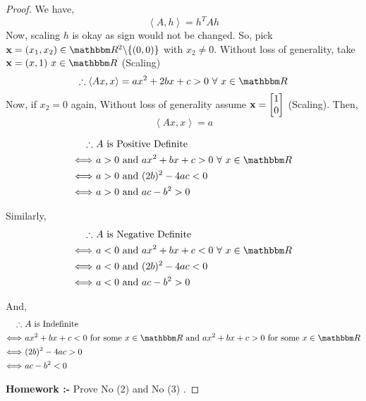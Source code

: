 \documentclass[../Analysis-3]{subfiles}
\begin{document}
\begin{proof}
    We have, \[ \left\langle A, h \right\rangle = h^TAh \]
    Now, scaling $h$ is okay as sign would not be changed. So, pick ${\bf x} = (x_1, x_2) \in \R^2 \backslash \{(0,0)\} $ with $x_2 \neq 0$.
    Without loss of generality, take ${\bf x} = (x,1) \ x \in \R$ (Scaling) \\
    \[ \therefore \left\langle Ax, x \right\rangle = ax^2 + 2bx + c > 0 \ \forall\ x \in \R \]
    Now, if $x_2 = 0$ again, Without loss of generality assume ${\bf x} = \begin{bmatrix}
            1 \\
            0
        \end{bmatrix}$ (Scaling). Then, \[ \left\langle Ax, x \right\rangle = a \]

    \begin{align*}
        \therefore          & \ A \text{ is Positive Definite}                         \\
        \Longleftrightarrow & \ a > 0 \text{ and } ax^2 + bx+c > 0 \ \forall\ x \in \R \\
        \Longleftrightarrow & \ a > 0 \text{ and } (2b)^2 - 4ac < 0                    \\
        \Longleftrightarrow & \ a > 0 \text{ and } ac - b^2 > 0
    \end{align*}

    Similarly,
    \begin{align*}
        \therefore          & \ A \text{ is Negative Definite}                         \\
        \Longleftrightarrow & \ a < 0 \text{ and } ax^2 + bx+c < 0 \ \forall\ x \in \R \\
        \Longleftrightarrow & \ a < 0 \text{ and } (2b)^2 - 4ac < 0                    \\
        \Longleftrightarrow & \ a < 0 \text{ and } ac - b^2 > 0
    \end{align*}

    And,
    \begin{align*}
        \therefore          & \ A \text{ is Indefinite}                                                                              \\
        \Longleftrightarrow & \ ax^2 + bx+c < 0 \ \text{for some } x \in \R \text{ and } ax^2 + bx+c > 0 \ \text{for some } x \in \R \\
        \Longleftrightarrow & \ (2b)^2 - 4ac > 0                                                                                     \\
        \Longleftrightarrow & \ ac - b^2 < 0
    \end{align*}

    \textbf{Homework :-} Prove No (2) and No (3) .
\end{proof}
\end{document}
